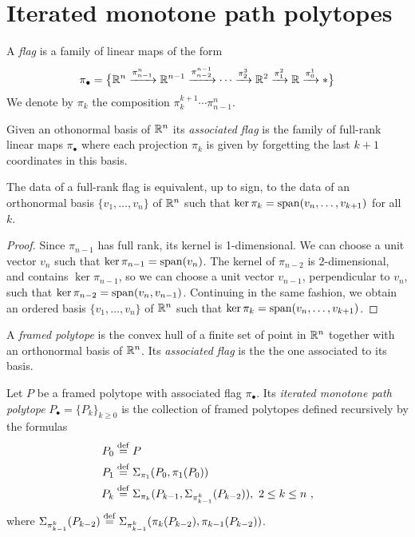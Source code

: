 
\section{Iterated monotone path polytopes}


\begin{definition}
	A \emph{flag} is a family of linear maps of the form
	\[
	\pi_\bullet = \big\{
	\mathbb{R}^n \xrightarrow{\pi^n_{n-1}} \mathbb{R}^{n-1} \xrightarrow{\pi^{n-1}_{n-2}} \dotsb \xrightarrow{\pi^3_{2}} \mathbb{R}^2 \xrightarrow{\pi^2_1} \mathbb{R} \xrightarrow{\pi^1_0} *
	\big\}
	\]
	We denote by $\pi_k$ the composition $\pi^{k+1}_{k}\cdots\pi^n_{n-1}$.
\end{definition}

Given an othonormal basis of $\mathbb{R}^n$ its \emph{associated flag} is the family of full-rank linear maps $\pi_\bullet$ where each projection $\pi_k$ is given by forgetting the last $k+1$ coordinates in this basis.

\begin{lemma}
	The data of a full-rank flag is equivalent, up to sign, to the data of an orthonormal basis $\{v_1,\ldots,v_n\}$ of $\mathbb{R}^n$ such that $\ker \pi_k=\operatorname{\mathrm{span}}(v_n, \ldots, v_{k+1})$ for all $k$.
\end{lemma}

\begin{proof}
	Since $\pi_{n-1}$ has full rank, its kernel is 1-dimensional.
	We can choose a unit vector $v_n$ such that $\ker \pi_{n-1} = \operatorname{\mathrm{span}}(v_n)$.
	The kernel of $\pi_{n-2}$ is 2-dimensional, and contains $\ker \pi_{n-1}$, so we can choose a unit vector $v_{n-1}$, perpendicular to $v_n$, such that $\ker \pi_{n-2}=\operatorname{\mathrm{span}}(v_n,v_{n-1})$.
	Continuing in the same fashion, we obtain an ordered basis $\{v_1,\ldots, v_n\}$ of $\mathbb{R}^n$ such that $\ker \pi_{k}=\operatorname{\mathrm{span}}(v_n,\ldots,v_{k+1})$.
\end{proof}

\begin{definition}
	A \textit{framed polytope} is the convex hull of a finite set of point in $\mathbb{R}^n$ together with an orthonormal basis of $\mathbb{R}^n$.
	Its \textit{associated flag} is the the one associated to its basis.
\end{definition}

\begin{definition}
	Let $P$ be a framed polytope with associated flag $\pi_\bullet$.
	Its \textit{iterated monotone path polytope} $P_\bullet = \{P_k\}_{k \geq 0}$ is the collection of framed polytopes defined recursively by the formulas
	\begin{align*}
		P_0 & \stackrel{\mathrm{def}}{=} P \\
		P_1 & \stackrel{\mathrm{def}}{=} \Sigma_{\pi_1}(P_0,\pi_1(P_0)) \\
		P_k & \stackrel{\mathrm{def}}{=} \Sigma_{\pi_k}(P_{k-1},\Sigma_{\pi^{k}_{k-1}}(P_{k-2})), \ 2 \leq k \leq n \ ,
	\end{align*}
	where $\Sigma_{\pi^{k}_{k-1}}(P_{k-2})\stackrel{\mathrm{def}}{=} \Sigma_{\pi^{k}_{k-1}}(\pi_k(P_{k-2}),\pi_{k-1}(P_{k-2}))$.
\end{definition}

